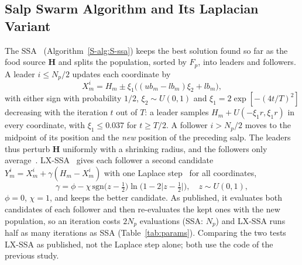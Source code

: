 \subsection{Salp Swarm Algorithm and Its Laplacian Variant}
\label{sec:ssa}
\label{sec:S-ssa}
The SSA~\cite{Mirjalili2017} (Algorithm~\ref{S-alg:S-ssa}) keeps the best solution found so far as the food source $\mathbf H$ and splits the population, sorted by $F_p$, into leaders and followers. A leader $i\le N_p/2$ updates each coordinate by
\begin{equation}\label{eq:leader}
X_m^i = H_m\pm\xi_1\big((ub_m-lb_m)\xi_2+lb_m\big),
\end{equation}
with either sign with probability $1/2$, $\xi_2\sim U(0,1)$ and $\xi_1=2\exp[-(4t/T)^2]$ decreasing with the iteration $t$ out of $T$: a leader samples $H_m+U(-\xi_1r,\xi_1r)$ in every coordinate, with $\xi_1\le0.037$ for $t\ge T/2$. A follower $i>N_p/2$ moves to the midpoint of its position and the \emph{new} position of the preceding salp. The leaders thus perturb $\mathbf H$ uniformly with a shrinking radius, and the followers only average~\cite{Castelli2022}. LX-SSA~\cite{Solanki2023} gives each follower a second candidate $Y_m^i=X_m^i+\gamma(H_m-X_m^i)$ with one Laplace step~\cite{Deep2007} for all coordinates,
\begin{equation}
\gamma=\phi-\chi\,\mathrm{sgn}\bigl(z-\tfrac12\bigr)\ln\bigl(1-2\lvert z-\tfrac12\rvert\bigr),\quad z\sim U(0,1),
\label{eq:laplace}
\end{equation}
$\phi=0$, $\chi=1$, and keeps the better candidate. As published, it evaluates both candidates of each follower and then re-evaluates the kept ones with the new population, so an iteration costs $2N_p$ evaluations (SSA: $N_p$) and LX-SSA runs half as many iterations as SSA (Table~\ref{tab:params}). Comparing the two tests LX-SSA as published, not the Laplace step alone; both use the code of the previous study.

